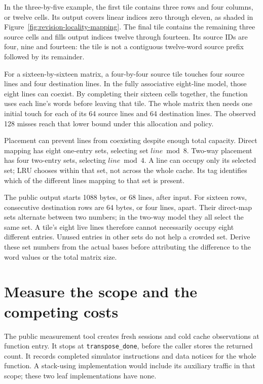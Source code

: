 In the three-by-five example, the first tile contains three rows and four columns,
or twelve cells. Its output covers linear indices zero through eleven, as shaded
in Figure~\ref{fig:revision-locality-mapping}. The final tile contains the remaining
three source cells and fills output indices twelve through fourteen. Its source
IDs are four, nine and fourteen: the tile is not a contiguous twelve-word source
prefix followed by its remainder.

For a sixteen-by-sixteen matrix, a four-by-four source tile touches four source
lines and four destination lines. In the fully associative eight-line model,
those eight lines can coexist. By completing their sixteen cells together, the
function uses each line's words before leaving that tile. The whole matrix then
needs one initial touch for each of its 64 source lines and 64 destination lines.
The observed 128 misses reach that lower bound under this allocation and policy.

Placement can prevent lines from coexisting despite enough total capacity.
Direct mapping has eight one-entry sets, selecting set $line\bmod8$. Two-way
placement has four two-entry sets, selecting $line\bmod4$. A line can occupy only
its selected set; LRU chooses within that set, not across the whole cache.
Its tag identifies which of the different lines mapping to that set is present.

The public output starts 1088 bytes, or 68 lines, after input. For sixteen rows,
consecutive destination rows are 64 bytes, or four lines, apart. Their direct-map
sets alternate between two numbers; in the two-way model they all select the
same set. A tile's eight live lines therefore cannot necessarily occupy eight
different entries. Unused entries in other sets do not help a crowded set.
Derive these set numbers from the actual bases before attributing the difference
to the word values or the total matrix size.

\section{Measure the scope and the competing costs}

The public measurement tool creates fresh sessions and cold cache observations
at function entry. It stops at \texttt{transpose\_done}, before the caller stores
the returned count. It records completed simulator instructions and data notices
for the whole function. A stack-using implementation would include its auxiliary
traffic in that scope; these two leaf implementations have none.

